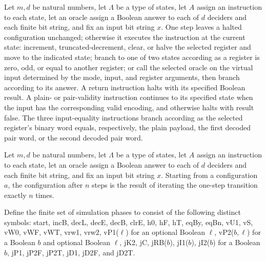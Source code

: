 \begin{definition}
\label{Complexity.LogProg.astep}
\leanok
{}
Let $m,d$ be natural numbers, let $\Lambda$ be a type of states, let $A$ assign an
instruction to each state, let an oracle assign a Boolean answer to each of $d$ deciders
and each finite bit string, and fix an input bit string $x$. One step leaves a halted
configuration unchanged; otherwise it executes the instruction at the current state:
increment, truncated-decrement, clear, or halve the selected register and move to the
indicated state; branch to one of two states according as a register is zero, odd, or
equal to another register; or call the selected oracle on the virtual input determined
by the mode, input, and register arguments, then branch according to its answer. A
return instruction halts with its specified Boolean result. A plain- or pair-validity
instruction continues to its specified state when the input has the corresponding valid
encoding, and otherwise halts with result false. The three input-equality instructions
branch according as the selected register's binary word equals, respectively, the plain
payload, the first decoded pair word, or the second decoded pair word.
\end{definition}

\begin{definition}
\label{Complexity.LogProg.arun}
\leanok
{}
Let $m,d$ be natural numbers, let $\Lambda$ be a type of states, let $A$ assign an
instruction to each state, let an oracle assign a Boolean answer to each of $d$ deciders
and each finite bit string, and fix an input bit string $x$. Starting from a
configuration $a$, the configuration after $n$ steps is the result of iterating the
one-step transition exactly $n$ times.
\end{definition}

\begin{definition}
\label{Complexity.LogProg.Ph}
\leanok
Define the finite set of simulation phases to consist of the following distinct symbols:
start, incB, decL, decE, decB, clrE, h0, hF, hT, eqBy, eqBn, vU1, vS, vW0, vWF, vWT,
vrw1, vrw2, vP1($\ell$) for an optional Boolean $\ell$, vP2($b,\ell$) for a Boolean $b$
and optional Boolean $\ell$, jK2, jC, jRB($b$), jI1($b$), jI2($b$) for a Boolean $b$,
jP1, jP2F, jP2T, jD1, jD2F, and jD2T.
\end{definition}


